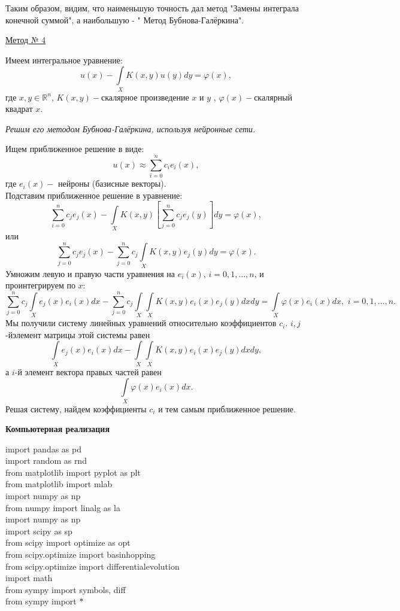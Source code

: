 \documentclass[12pt]{article}
\begin{document}
Таким образом, видим, что наименьшую точность дал метод "Замены интеграла конечной суммой", а наибольшую - " Метод Бубнова-Галёркина".

\newpage
\begin{center}
	\underline{Метод № 4}\\
\end{center}
Имеем интегральное уравнение:
$$u(x) - \int\limits_X K(x, y)u(y)dy = \varphi(x),$$
где $ x, y \in \mathbb{R}^n $, $ K(x,y) -$скалярное произведение $ x $ и $ y $ , $ \varphi(x) -$скалярный квадрат $ x $. \\
\begin{center}
	\textit{Решим его методом Бубнова-Галёркина, используя нейронные сети.}
\end{center}
Ищем приближенное решение в виде:
$$u(x) \approx\sum_{i=0}^n c_i e_i(x),$$
где $ e_i(x) -$ нейроны (базисные векторы).\\
Подставим приближенное решение в уравнение:
$$\sum_{i=0}^n c_j e_j(x) - \int\limits_X K(x, y)\left[\sum_{j=0}^n c_j e_j(y)\right]dy = \varphi(x),$$
или
$$\sum_{j=0}^n c_j e_j(x) - \sum_{j=0}^n c_j \int\limits_X K(x, y)e_j(y)dy = \varphi(x).$$
Умножим левую и правую части уравнения на $e_i(x)$, $i=0,1,\ldots,n$, и проинтегрируем по $x$:
$$\sum_{j=0}^n c_j\int\limits_X e_j(x)e_i(x)dx - \sum_{j=0}^n c_j \int\limits_X\int\limits_X K(x, y)e_i(x)e_j(y)dxdy = \int\limits_X\varphi(x)e_i(x)dx,\,\,i=0,1,\ldots,n.$$
Мы получили систему линейных уравнений относительно коэффициентов $c_i$. $i,j$-йэлемент матрицы этой системы равен
$$\int\limits_X e_j(x)e_i(x)dx - \int\limits_X\int\limits_X K(x, y)e_i(x)e_j(y)dxdy,$$ а $i$-й элемент вектора правых частей равен
$$\int\limits_X\varphi(x)e_i(x)dx.$$
Решая систему, найдем коэффициенты $c_i$ и тем самым приближенное решение.\\
\newpage
\begin{center}
		\textbf{Компьютерная реализация}
\end{center}
import pandas as pd\\
import random as rnd\\
from matplotlib import pyplot as plt\\
from matplotlib import mlab\\
import numpy as np\\
from numpy import linalg as la\\
import numpy as np\\
import scipy as sp\\
from scipy import optimize as opt\\
from scipy.optimize import basinhopping\\
from scipy.optimize import differentialevolution\\
import math\\
from sympy import symbols, diff\\
from sympy import *\\
\end{document}
